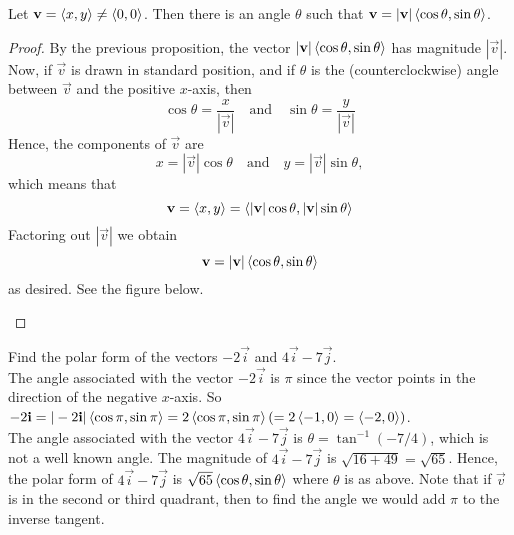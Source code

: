 \documentclass[handout]{ximera}
\begin{document}
\begin{proposition}
Let $\mathbf{v} = \left\langle x,y\right\rangle \neq \left\langle 0,0\right\rangle$.  Then there is an angle $\theta$ such that $\mathbf{v} = |\mathbf{v}| \left\langle \cos \theta, \sin \theta\right\rangle$.
\begin{proof}
By the previous proposition, the vector $|\mathbf{v}| \left\langle \cos \theta, \sin \theta\right\rangle$ has magnitude $|\vec{v}|$. 
Now, if $\vec{v}$ is drawn in standard position, and if $\theta$ is the (counterclockwise) angle between $\vec{v}$ and the positive $x$-axis, 
then 
\[
\cos \theta = \frac{x}{|\vec v|} \quad \text{and} \quad \sin \theta = \frac{y}{|\vec v|}
\]
Hence, the components of $\vec{v}$ are 
\[
x = |\vec{v}|\cos \theta \quad \text{and} \quad y = |\vec{v}|\sin \theta, 
\]
which means that
\[
\mathbf v = \left\langle x,y\right\rangle = \left\langle |\mathbf{v}|\cos\theta,|\mathbf{v}|\sin\theta\right\rangle 
\]
Factoring out $|\vec v|$ we obtain
\[
\mathbf v = |\mathbf{v}|\left\langle \cos\theta,\sin\theta\right\rangle
\]
as desired. See the figure below.
\begin{image}
\end{image}


\end{proof}
\end{proposition}

\begin{example}[Example 4]
Find the polar form of the vectors $-2\vec{i}$ and $4\vec{i}-7\vec{j}$.\\
The angle associated with the vector $-2\vec{i}$ is $\pi$ since the vector points in the direction of the negative $x$-axis.
So $-2\mathbf{i} = |-2\mathbf{i}| \left\langle \cos \pi, \sin \pi\right\rangle = 2\left\langle \cos \pi, \sin \pi\right\rangle (= 2\left\langle -1, 0\right\rangle = \left\langle -2, 0\right\rangle)$.\\
The angle associated with the vector $4\vec{i}-7\vec{j}$ is $\theta = \tan^{-1}(-7/4)$, which is not a well known angle.
The magnitude of $4\vec{i}-7\vec{j}$ is $\sqrt{16 +49} = \sqrt{65}$.  Hence, the polar form of $4\vec{i}-7\vec{j}$ is
$\sqrt{65}\left\langle \cos \theta, \sin\theta\right\rangle$ where $\theta$ is as above. Note that if $\vec{v}$ is in the second or third quadrant, then 
to find the angle we would add $\pi$ to the inverse tangent.
\end{example}
\end{document}
